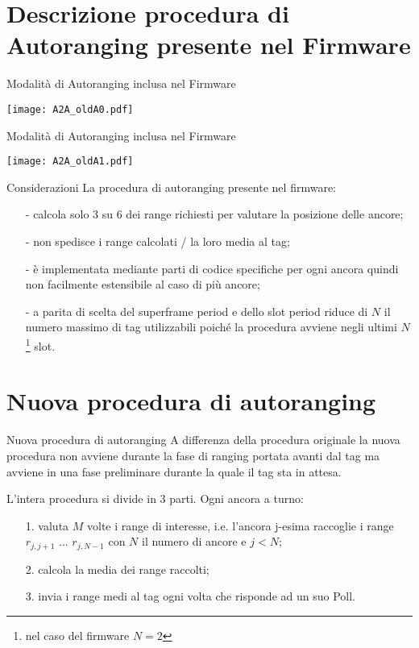\section{Descrizione procedura di Autoranging presente nel Firmware}

\begin{frame}{Modalità di Autoranging inclusa nel Firmware}  
  \begin{center}
    \texttt{[image: A2A\_oldA0.pdf]}
  \end{center}
\end{frame}

\begin{frame}{Modalità di Autoranging inclusa nel Firmware}
  \begin{center}
    \texttt{[image: A2A\_oldA1.pdf]}
  \end{center}
\end{frame}

\begin{frame}{Considerazioni}
  La procedura di autoranging presente nel firmware:
  \begin{itemize}
  \item [-] calcola solo 3 su 6 dei range richiesti per valutare la posizione delle ancore;
  \item [-] non spedisce i range calcolati / la loro media al tag;
  \item [-] è implementata mediante parti di codice specifiche per ogni ancora quindi \alert{non}
    facilmente estensibile al caso di più ancore;
  \item [-] a parita di scelta del superframe period e dello slot period \alert{riduce} di $N$ il numero
    massimo di tag utilizzabili poiché la procedura avviene negli ultimi $N$\footnote{nel caso del
      firmware $N = 2$} slot.
  \end{itemize}
\end{frame}

\section{Nuova procedura di autoranging}

\begin{frame}{Nuova procedura di autoranging}
  A differenza della procedura originale la nuova procedura \alert{non} avviene durante la fase
  di ranging portata avanti dal tag ma avviene in una fase preliminare durante la quale il tag sta in
  attesa.
  \par
  L'intera procedura si divide in 3 parti. Ogni ancora \alert{a turno}: 
  \begin{itemize}
  \item [1.] valuta $M$ volte i range di interesse, i.e. l'ancora
    j-esima raccoglie i range $r_{j,j+1}$ ... $r_{j,N-1}$ con $N$ il numero di ancore e $j<N$;
  \item [2.] calcola la media dei range raccolti;
  \item [3.] invia i range medi al tag ogni volta che risponde ad un suo Poll.
  \end{itemize}
\end{frame}

